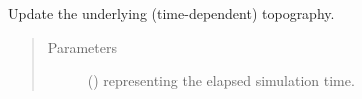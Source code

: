 \documentclass[letterpaper,10pt,english]{sphinxmanual}
\begin{document}
\begin{fulllineitems}
\begin{fulllineitems}
\end{fulllineitems}


\begin{fulllineitems}
\label{\detokenize{api:dycore.dycore.DynamicalCore.update_topography}}
Update the underlying (time-dependent) topography.
\begin{quote}\begin{description}
\item[{Parameters}] \leavevmode
{} () \textendash{}  representing the elapsed simulation time.

\end{description}\end{quote}

\end{fulllineitems}


\end{fulllineitems}

\end{document}
